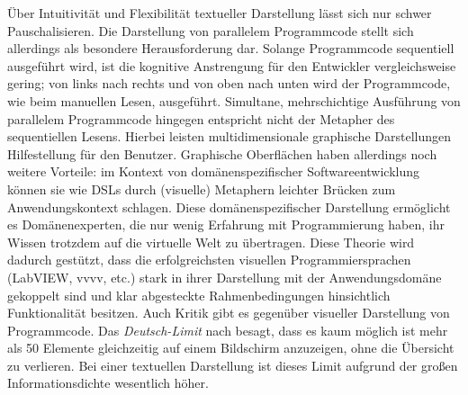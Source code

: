 Über Intuitivität und Flexibilität textueller Darstellung lässt sich nur schwer Pauschalisieren. Die Darstellung von parallelem Programmcode stellt sich allerdings als besondere Herausforderung dar. Solange Programmcode sequentiell ausgeführt wird, ist die kognitive Anstrengung für den Entwickler vergleichsweise gering; von links nach rechts und von oben nach unten wird der Programmcode, wie beim manuellen Lesen, ausgeführt. Simultane, mehrschichtige Ausführung von parallelem Programmcode hingegen entspricht nicht der Metapher des sequentiellen Lesens. Hierbei leisten multidimensionale graphische Darstellungen Hilfestellung für den Benutzer. Graphische Oberflächen haben allerdings noch weitere Vorteile: im Kontext von domänenspezifischer Softwareentwicklung können sie wie \acp{DSL} durch (visuelle) Metaphern leichter Brücken zum Anwendungskontext schlagen. Diese domänenspezifischer Darstellung ermöglicht es Domänenexperten, die nur wenig Erfahrung mit Programmierung haben, ihr Wissen trotzdem auf die virtuelle Welt zu übertragen. Diese Theorie wird dadurch gestützt, dass die erfolgreichsten visuellen Programmiersprachen (LabVIEW, vvvv, etc.) stark in ihrer Darstellung mit der Anwendungsdomäne gekoppelt sind und klar abgesteckte Rahmenbedingungen hinsichtlich Funktionalität besitzen. Auch Kritik gibt es gegenüber visueller Darstellung von Programmcode. Das \textit{Deutsch-Limit} nach \cite{begel1996logoblocks} besagt, dass es kaum möglich ist mehr als 50 Elemente gleichzeitig auf einem Bildschirm anzuzeigen, ohne die Übersicht zu verlieren. Bei einer textuellen Darstellung ist dieses Limit aufgrund der großen Informationsdichte wesentlich höher.

